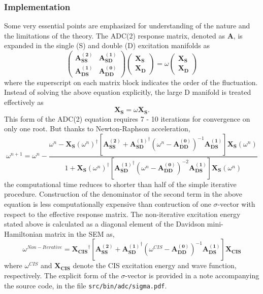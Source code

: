 \subsubsection{Implementation}
Some very essential points are emphasized for understanding of the
nature and the limitations of the theory. The ADC(2) response matrix,
denoted as $\mathbf{A}$, is expanded in the single (S) and double (D)
excitation manifolds as
\begin{equation*}
\begin{pmatrix}
\mathbf{A_{SS}^{(2)}} & \mathbf{A_{SD}^{(1)}}\\
\mathbf{A_{DS}^{(1)}} & \mathbf{A_{DD}^{(0)}}
\end{pmatrix}
\begin{pmatrix}
\mathbf{X_S}\\
\mathbf{X_D}
\end{pmatrix}
=\omega
\begin{pmatrix}
\mathbf{X_S}\\
\mathbf{X_D}
\end{pmatrix}
\end{equation*}
where the superscript on each matrix block indicates the order of
the fluctuation. Instead of solving the above equation explicitly,
the large D manifold is treated effectively as
\begin{equation*}
[\mathbf{A_{SS}^{(2)}}+\mathbf{A_{SD}^{(1)}}^{\dagger}(\omega-\mathbf{A_{DD}^{(0)}})^{-1}\mathbf{A_{DS}^{(1)}}]\mathbf{X_{S}}=\omega\mathbf{X_{S}}.
\end{equation*}
This form of the ADC(2) equation requires 7 - 10 iterations for
convergence on only one root. But thanks to Newton-Raphson
acceleration,
\begin{equation*}
\omega^{n+1}=\omega^{n}-\frac{\omega^n-\mathbf{X_{S}}(\omega^n)^{\dagger}[\mathbf{A_{SS}^{(2)}}+\mathbf{A_{SD}^{(1)}}^{\dagger}(\omega^n-\mathbf{A_{DD}^{(0)}})^{-1}\mathbf{A_{DS}^{(1)}}]\mathbf{X_{S}}(\omega^n)}{1+\mathbf{X_{S}}(\omega^n)^{\dagger}[\mathbf{A_{SD}^{(1)}}^{\dagger}(\omega^n-\mathbf{A_{DD}^{(0)}})^{-2}\mathbf{A_{DS}^{(1)}}]\mathbf{X_{S}}(\omega^n)}
\end{equation*}
the computational time reduces to shorter than half of the simple iterative
procedure. Construction of the denominator of the second term in the above
equation is less computationally expensive than contruction of one $\sigma$-vector with respect to the effective response matrix. The non-iterative excitation energy stated above is calculated as a diagonal element of the Davidson mini-Hamiltonian matrix in the SEM as,
\begin{equation*}
\omega^{Non-Iterative}=\mathbf{X_{CIS}}^{\dagger}[\mathbf{A_{SS}^{(2)}}+\mathbf{A_{SD}^{(1)}}^{\dagger}(\omega^{CIS}-\mathbf{A_{DD}^{(0)}})^{-1}\mathbf{A_{DS}^{(1)}}]\mathbf{X_{CIS}}
\end{equation*}
where $\omega^{CIS}$ and $\mathbf{X_{CIS}}$ denote the CIS excitation
energy and wave function, respectively. The explicit form of the 
$\sigma$-vector is provided in a note accompanying the source code,
in the file {\tt src/bin/adc/sigma.pdf}. 

